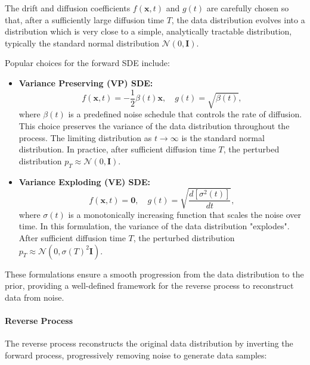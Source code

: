 \begin{itemize}
    The drift and diffusion coefficients \( f(\mathbf{x}, t) \) and \( g(t) \) are carefully chosen so that, after a sufficiently large diffusion time \( T \), the data distribution evolves into a distribution which is very close to a simple, analytically tractable distribution, typically the standard normal distribution \( \mathcal{N}(0, \mathbf{I}) \).
    
    Popular choices for the forward SDE include:
    
    \begin{itemize}
        \item \textbf{Variance Preserving (VP) SDE:}
        \[
        f(\mathbf{x}, t) = -\frac{1}{2} \beta(t) \mathbf{x}, \quad g(t) = \sqrt{\beta(t)},
        \]
        where \( \beta(t) \) is a predefined noise schedule that controls the rate of diffusion. This choice preserves the variance of the data distribution throughout the process. The limiting distribution as \( t \to \infty \) is the standard normal distribution. In practice, after sufficient diffusion time $T$, the perturbed distribution $p_T \approx \mathcal{N}(0, \mathbf{I})$.
    
        \item \textbf{Variance Exploding (VE) SDE:}
        \[
        f(\mathbf{x}, t) = \mathbf{0}, \quad g(t) = \sqrt{\frac{d[\sigma^2(t)]}{dt}},
        \]
        where \( \sigma(t) \) is a monotonically increasing function that scales the noise over time. In this formulation, the variance of the data distribution "explodes". After sufficient diffusion time $T$, the perturbed distribution $p_T \approx \mathcal{N}(0, \sigma(T)^2\mathbf{I}).$
    \end{itemize}

\end{itemize}

These formulations ensure a smooth progression from the data distribution to the prior, providing a well-defined framework for the reverse process to reconstruct data from noise.


\paragraph{Reverse Process}

The reverse process reconstructs the original data distribution by inverting the forward process, progressively removing noise to generate data samples:

